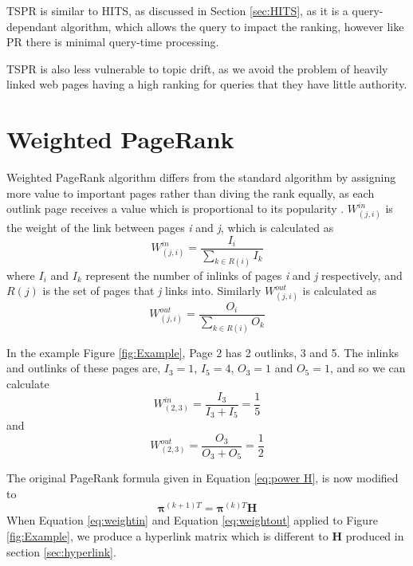 \documentclass[11pt]{report}
\begin{document}
{TSPR is similar to HITS, as discussed in Section \ref{sec:HITS}, as it is a query-dependant algorithm, which allows the query to impact the ranking, however like PR there is minimal query-time processing. 

TSPR is also less vulnerable to topic drift, as we avoid the problem of heavily linked web pages having a high ranking for queries that they have little authority. 

\section{Weighted PageRank}\label{sec:weighted}

Weighted PageRank algorithm differs from the standard algorithm by assigning more value to important pages rather than diving the rank equally, as each outlink page receives a value which is proportional to its popularity \cite{xing2004weighted}. $W^{in}_{(j,i)}$ is the weight of the link between pages \textit{i} and \textit{j}, which is calculated as 
\begin{equation}\label{eq:weightin}
W^{in}_{(j,i)} = \frac{I_i}{\sum_{k\in R(i)}I_k}
\end{equation}
where $I_i$ and $I_k$ represent the number of inlinks of pages \textit{i} and \textit{j} respectively, and $R(j)$ is the set of pages that \textit{j} links into. 
Similarly $W^{out}_{(j,i)}$ is calculated as
\begin{equation}\label{eq:weightout}
W^{out}_{(j,i)} = \frac{O_i}{\sum_{k\in R(i)}O_k}
\end{equation}

In the example Figure \ref{fig:Example}, Page 2 has 2 outlinks, 3 and 5. The inlinks and outlinks of these pages are, $I_3 = 1$, $I_5 = 4$, $O_3 = 1$ and $O_5 = 1$, and so we can calculate 
\[W^{in}_{(2,3)} = \frac{I_3}{I_3 + I_5} = \frac{1}{5} \]
and 
\[W^{out}_{(2,3)} = \frac{O_3}{O_3 + O_5} = \frac{1}{2} \] 

The original PageRank formula given in Equation \eqref{eq:power H}, is now modified to 
\begin{equation} \label{eq:WPR formula}
\boldsymbol\pi^{(k+1)T} = \boldsymbol\pi^{(k)T}\textbf{H}
\end{equation}
When Equation \eqref{eq:weightin} and Equation \eqref{eq:weightout} applied to Figure \ref{fig:Example}, we produce a hyperlink matrix which is different to \textbf{H} produced in section \ref{sec:hyperlink}. 

}
\end{document}
